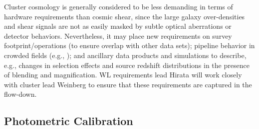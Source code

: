 Cluster cosmology is generally considered to be less demanding in terms of hardware requirements than
cosmic shear, since the large galaxy over-densities and shear signals are not as easily masked by
subtle optical aberrations or detector behaviors. Nevertheless, it may place new requirements
on survey footprint/operations (to ensure overlap with other data sets); pipeline behavior in
crowded fields (e.g., \cite{2015MNRAS.449.1259S}); and ancillary data products and simulations to describe, e.g., changes in selection
effects and source redshift distributions in the presence of blending and magnification.
WL requirements lead Hirata will work closely with cluster lead Weinberg to ensure that these
requirements are captured in the flow-down.

%
%


\subsection{Photometric Calibration}
\label{sec:wl_calibration}

